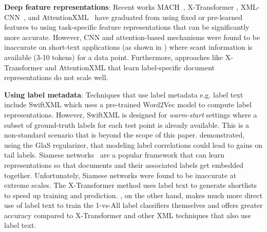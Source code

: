 \textbf{Deep feature representations}: Recent works MACH~\citep{Medini2019}, X-Transformer \cite{Chang20}, XML-CNN~\citep{Liu17}, and AttentionXML~\citep{Liu17} have graduated from using fixed or pre-learned features to using task-specific feature representations that can be significantly more accurate. However, CNN and attention-based mechanisms were found to be inaccurate on short-text applications (as shown in \cite{Dahiya21}) where scant information is available (3-10 tokens) for a data point. Furthermore, approaches like X-Transformer and AttentionXML that learn label-specific document representations do not scale well.

\textbf{Using label metadata}: Techniques that use label metadata e.g. label text include SwiftXML \citep{Prabhu18} which uses a pre-trained Word2Vec \citep{Mikolov13} model to compute label representations. However, SwiftXML is designed for \emph{warm-start} settings where a subset of ground-truth labels for each test point is already available. This is a non-standard scenario that is beyond the scope of this paper. \citep{Guo2019} demonstrated, using the GlaS regularizer, that modeling label correlations could lead to gains on tail labels. Siamese networks~\citep{Wu17} are a popular framework that can learn representations so that documents and their associated labels get embedded together. Unfortunately, Siamese networks were found to be inaccurate at extreme scales. The X-Transformer method \cite{Chang20} uses label text to generate shortlists to speed up training and prediction. \alg, on the other hand, makes much more direct use of label text to train the 1-vs-All label classifiers themselves and offers greater accuracy compared to X-Transformer and other XML techniques that also use label text.
